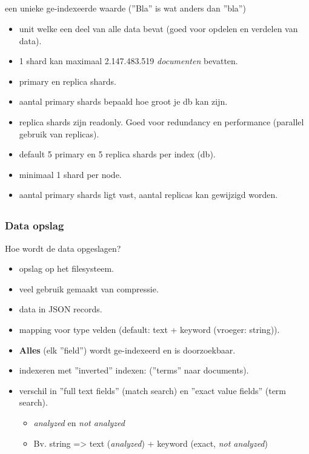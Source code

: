 \subsection{}
\begin{styleframe}
\begin{description}[<+>][documentbla]
	\frametitle{}
	\item[term] een unieke ge-indexeerde waarde (''Bla'' is wat anders dan ''bla'')
	\item[shard]
	\begin{itemize}
		\item unit welke een deel van alle data bevat (goed voor opdelen en verdelen van data).
		\item 1 shard kan maximaal 2.147.483.519 {\it documenten} bevatten.
		\item primary en replica shards.
		\item aantal primary shards bepaald hoe groot je db kan zijn.
		\item replica shards zijn readonly. Goed voor redundancy en performance (parallel gebruik van replicas).
		\item default 5 primary en 5 replica shards per index (db).
		\item minimaal 1 shard per node.
		\item aantal primary shards ligt vast, aantal replicas kan gewijzigd worden.
	\end{itemize}
\end{description}
\end{styleframe}

\subsection{}
\begin{styleframe}
	\frametitle{Data opslag}
Hoe wordt de data opgeslagen? 
\begin{itemize}[<+>]
	\item opslag op het filesysteem.
	\item veel gebruik gemaakt van compressie.
	\item data in JSON records.
	\item mapping voor type velden (default: text + keyword (vroeger: string)).
	\item \textbf{Alles} (elk ''field'') wordt ge-indexeerd en is doorzoekbaar.
	\item indexeren met ''inverted'' indexen: (''terms'' naar documents).
	\item verschil in ''full text fields'' (match search) en ''exact value fields'' (term search).
	\begin{itemize}
		\item {\it analyzed} en {\it not analyzed}
		\item Bv. string => text ({\it analyzed}) + keyword (exact, {\it not analyzed})
	\end{itemize}
\end{itemize}
\end{styleframe}

